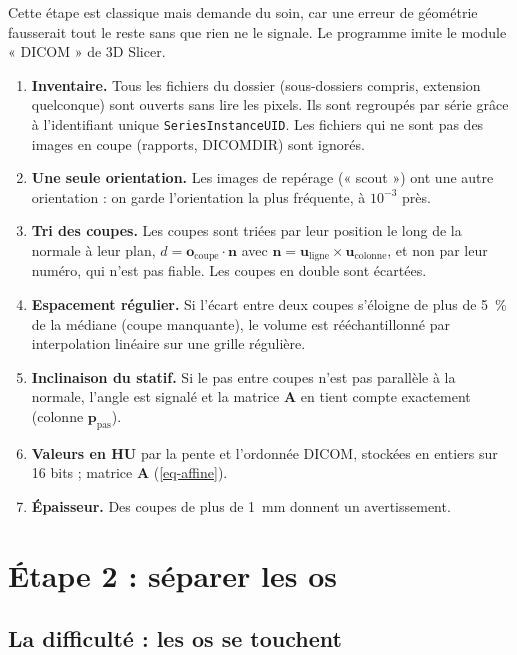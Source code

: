 \documentclass[11pt,a4paper]{article}
\newcommand{\vb}[1]{\mathbf{#1}}
\begin{document}
Cette étape est classique mais demande du soin, car une erreur de géométrie fausserait tout le reste sans que rien ne
le signale. Le programme imite le module « DICOM » de 3D Slicer.

\begin{enumerate}
  \item \textbf{Inventaire.} Tous les fichiers du dossier (sous-dossiers compris, extension quelconque) sont ouverts
  sans lire les pixels. Ils sont regroupés par série grâce à l'identifiant unique \texttt{SeriesInstanceUID}. Les
  fichiers qui ne sont pas des images en coupe (rapports, DICOMDIR) sont ignorés.
  \item \textbf{Une seule orientation.} Les images de repérage (« scout ») ont une autre orientation : on garde
  l'orientation la plus fréquente, à $10^{-3}$ près.
  \item \textbf{Tri des coupes.} Les coupes sont triées par leur position le long de la normale à leur plan,
  $d = \vb{o}_{\text{coupe}} \cdot \vb{n}$ avec $\vb{n} = \vb{u}_{\text{ligne}} \times \vb{u}_{\text{colonne}}$, et non par
  leur numéro, qui n'est pas fiable. Les coupes en double sont écartées.
  \item \textbf{Espacement régulier.} Si l'écart entre deux coupes s'éloigne de plus de 5~\% de la médiane (coupe
  manquante), le volume est rééchantillonné par interpolation linéaire sur une grille régulière.
  \item \textbf{Inclinaison du statif.} Si le pas entre coupes n'est pas parallèle à la normale, l'angle est signalé
  et la matrice $\vb{A}$ en tient compte exactement (colonne $\vb{p}_{\text{pas}}$).
  \item \textbf{Valeurs en HU} par la pente et l'ordonnée DICOM, stockées en entiers sur 16 bits ; matrice $\vb{A}$
  (\cref{eq-affine}).
  \item \textbf{Épaisseur.} Des coupes de plus de 1~mm donnent un avertissement.
\end{enumerate}

\section{Étape 2 : séparer les os}
\label{sec-segmentation}

\subsection{La difficulté : les os se touchent}
\end{document}

